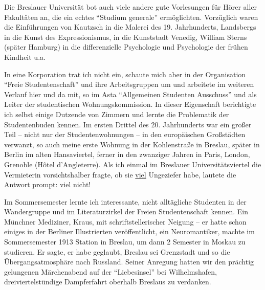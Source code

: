 Die Breslauer Universität bot auch viele andere gute Vorlesungen für Hörer aller Fakultäten an, die ein echtes \enquote{Studium generale} ermöglichten. Vorzüglich waren die Einführungen von Kautzsch in die Malerei des 19. Jahrhunderts, Landsbergs in die Kunst des Expressionismus, in die Kunststadt Venedig, William Sterns (später Hamburg) in die differenzielle Psychologie und Psychologie der frühen Kindheit u.a.

In eine Korporation trat ich nicht ein, schaute mich aber in der Organisation \enquote{Freie Studentenschaft} und ihre Arbeitsgruppen um und arbeitete im weiteren Verlauf hier und da mit, so im Asta \enquote{Allgemeinen Studenten Ausschuss} und als Leiter der studentischen Wohnungskommission. In dieser Eigenschaft berichtigte ich selbst einige Dutzende von Zimmern und lernte die Problematik der Studentenbuden kennen. Im ersten Drittel des 20. Jahrhunderts war ein großer Teil -- nicht nur der Studentenwohnungen -- in den europäischen Großstädten verwanzt, so auch meine erste Wohnung in der Kohlenstraße in Breslau, später in Berlin im alten Hansaviertel, ferner in den zwanziger Jahren in Paris, London, Grenoble (Hôtel d'Angleterre). Als ich einmal im Breslauer Universitätsviertel die Vermieterin vorsichtshalber fragte, ob sie \underline{viel} Ungeziefer habe, lautete die Antwort prompt: viel nicht!

Im Sommersemester lernte ich interessante, nicht alltägliche Studenten in der Wandergruppe und im Literaturzirkel der Freien Studentenschaft kennen. Ein Münchner Mediziner, Kraus, mit schriftstellerischer Neigung -- er hatte schon einiges in der Berliner Illustrierten veröffentlicht, ein Neuromantiker, machte im Sommersemester 1913 Station in Breslau, um dann 2 Semester in Moskau zu studieren. Er sagte, er habe geglaubt, Breslau sei Grenzstadt und so die Übergangsatmosphäre nach Russland. Seiner Anregung hatten wir den prächtig gelungenen Märchenabend auf der \enquote{Liebesinsel} bei Wilhelmshafen, dreiviertelstündige Dampferfahrt oberhalb Breslaus zu verdanken.

